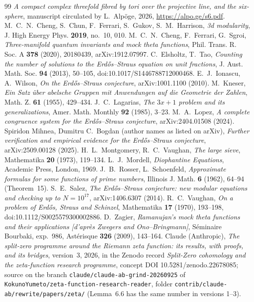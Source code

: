 \begin{thebibliography}{99}
\small
{} \emph{A compact complex threefold fibred by tori over the projective line, and the six-sphere}, manuscript circulated by L.~Alpöge, 2026, \url{https://alpo.ge/s6.pdf}.
 M.~C.~N.~Cheng, S.~Chun, F.~Ferrari, S.~Gukov, S.~M.~Harrison, \emph{3d modularity}, J. High Energy Phys. \textbf{2019}, no.~10, 010.
 M.~C.~N.~Cheng, F.~Ferrari, G.~Sgroi, \emph{Three-manifold quantum invariants and mock theta functions}, Phil. Trans. R. Soc. A \textbf{378} (2020), 20180439, arXiv:1912.07997.
 C.~Elsholtz, T.~Tao, \emph{Counting the number of solutions to the Erdős--Straus equation on unit fractions}, J. Aust. Math. Soc. \textbf{94} (2013), 50--105, doi:10.1017/S1446788712000468.
 E.~J.~Ionascu, A.~Wilson, \emph{On the Erdős--Straus conjecture}, arXiv:1001.1100 (2010).
 M.~Kneser, \emph{Ein Satz über abelsche Gruppen mit Anwendungen auf die Geometrie der Zahlen}, Math. Z. \textbf{61} (1955), 429--434.
 J.~C.~Lagarias, \emph{The $3x+1$ problem and its generalizations}, Amer. Math. Monthly \textbf{92} (1985), 3--23.
 M.~A.~Lopez, \emph{A complete congruence system for the Erdős--Straus conjecture}, arXiv:2404.01508 (2024).
 Spiridon Mihnea, Dumitru C.~Bogdan (author names as listed on arXiv), \emph{Further verification and empirical evidence for the Erdős--Straus conjecture}, arXiv:2509.00128 (2025).
 H.~L.~Montgomery, R.~C.~Vaughan, \emph{The large sieve}, Mathematika \textbf{20} (1973), 119--134.
 L.~J.~Mordell, \emph{Diophantine Equations}, Academic Press, London, 1969.
 J.~B.~Rosser, L.~Schoenfeld, \emph{Approximate formulas for some functions of prime numbers}, Illinois J. Math. \textbf{6} (1962), 64--94 (Theorem~15).
 S.~E.~Salez, \emph{The Erdős--Straus conjecture: new modular equations and checking up to $N=10^{17}$}, arXiv:1406.6307 (2014).
 R.~C.~Vaughan, \emph{On a problem of Erdős, Straus and Schinzel}, Mathematika \textbf{17} (1970), 193--198, doi:10.1112/S0025579300002886.
 D.~Zagier, \emph{Ramanujan's mock theta functions and their applications [d'après Zwegers and Ono--Bringmann]}, Séminaire Bourbaki, exp.~986, Astérisque \textbf{326} (2009), 143--164.
 Claude (Anthropic), \emph{The split-zero programme around the Riemann zeta function: its results, with proofs, and its bridges}, version~3, 2026, in the Zenodo record \emph{Split-Zero cohomology and the zeta-function research programme}, concept DOI 10.5281/zenodo.22678085; source on the branch \texttt{claude/claude-ab-grind-20260925} of \texttt{KokunoYumeto/zeta-function-research-reader}, folder \texttt{contrib/claude-ab/rewrite/papers/zeta/} (Lemma~6.6 has the same number in versions 1--3).

\end{thebibliography}
